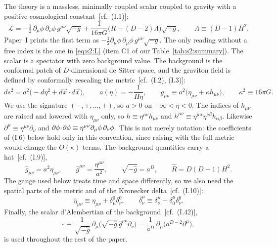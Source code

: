 \documentclass[aps,prd,onecolumn,10pt,nofootinbib,floatfix]{revtex4-2}
\newcommand{\PI}{Paper~I}
\newcommand{\eqI}[1]{(I.#1)}
\begin{document}
The theory is a massless, minimally coupled scalar coupled to gravity with a
positive cosmological constant~[cf.\ \eqI{1}]:
\begin{equation}
\mathcal L=-\tfrac12\,\partial_\mu\phi\,\partial_\nu\phi\,g^{\mu\nu}\sqrt{-g}
+\frac{1}{16\pi G}\big(R-(D-2)\Lambda\big)\sqrt{-g},
\qquad \Lambda\equiv(D-1)H^2 .
\label{eq:s2:L}
\end{equation}
\PI{} prints the first term as
$-\tfrac12\partial_\mu\phi\,\partial_\mu\phi\,g^{\mu\nu}\sqrt{-g}$. The only
reading without a free index is the one in \eqref{eq:s2:L} (item C1 of
our Table~\ref{tab:s2:summary}). The scalar is a spectator with zero background
value. The background is the conformal patch of $D$-dimensional de Sitter
space, and the graviton field is defined by conformally rescaling the
metric~[cf.\ \eqI{2}, \eqI{3}]:
\begin{equation}
ds^2=a^2\big(-d\eta^2+d\vec x\cdot d\vec x\big),\qquad a(\eta)=-\frac{1}{H\eta},
\qquad
g_{\mu\nu}\equiv a^2\big(\eta_{\mu\nu}+\kappa h_{\mu\nu}\big),\qquad \kappa^2\equiv16\pi G .
\label{eq:s2:background}
\end{equation}
We use the signature $(-,+,\ldots,+)$, so $a>0$ on $-\infty<\eta<0$. The
indices of $h_{\mu\nu}$ are raised and lowered with $\eta_{\mu\nu}$ only, so
$h\equiv\eta^{\mu\nu}h_{\mu\nu}$ and
$h^{\mu\nu}\equiv\eta^{\mu\alpha}\eta^{\nu\beta}h_{\alpha\beta}$. Likewise
$\partial^\mu\equiv\eta^{\mu\nu}\partial_\nu$ and
$\partial\phi\!\cdot\!\partial\phi\equiv\eta^{\mu\nu}\partial_\mu\phi\,\partial_\nu\phi$. This is not
merely notation: the coefficients of \eqI{6} below hold only in this
convention, since raising with the full metric would change the
$O(\kappa)$ terms. The background quantities carry a hat~[cf.\ \eqI{9}],
\begin{equation}
\hat g_{\mu\nu}=a^2\eta_{\mu\nu},\qquad \hat g^{\mu\nu}=\frac{\eta^{\mu\nu}}{a^2},\qquad
\sqrt{-\hat g}=a^D,\qquad \hat R=D(D-1)H^2 .
\label{eq:s2:hat}
\end{equation}
The gauge used below treats time and space differently, so we also need the
spatial parts of the metric and of the Kronecker delta~[cf.\ \eqI{10}]:
\begin{equation}
\bar\eta_{\mu\nu}\equiv\eta_{\mu\nu}+\delta^0_\mu\delta^0_\nu ,\qquad
\bar\delta^\mu_\nu\equiv\delta^\mu_\nu-\delta^\mu_0\delta^0_\nu .
\label{eq:s2:bar}
\end{equation}
Finally, the scalar d'Alembertian of the background~[cf.\ \eqI{42}],
\begin{equation}
\square\equiv\frac{1}{\sqrt{-\hat g}}\,\partial_\mu\big(\sqrt{-\hat g}\,\hat g^{\mu\nu}\partial_\nu\big)
=\frac{1}{a^D}\,\partial_\mu\big(a^{D-2}\partial^\mu\big),
\label{eq:s2:box}
\end{equation}
is used throughout the rest of the paper.
\end{document}
